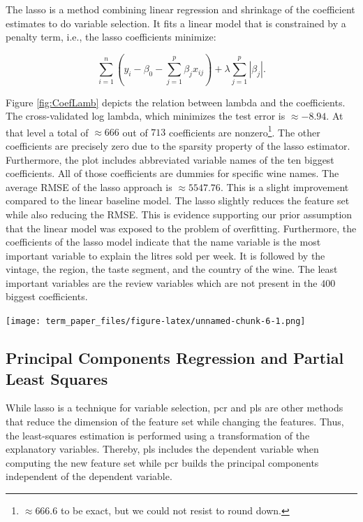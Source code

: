 \documentclass[11pt,]{article}
\let\origfigure\figure
\let\endorigfigure\endfigure
\renewenvironment{figure}[1][2] {
    \expandafter\origfigure\expandafter[H]
} {
    \endorigfigure
}
\let\rmarkdownfootnote\footnote%
\def\footnote{\protect\rmarkdownfootnote}
\begin{document}
The \ac{lasso} is a method combining linear regression and shrinkage of
the coefficient estimates to do variable selection. It fits a linear
model that is constrained by a penalty term, i.e., the \ac{lasso}
coefficients minimize:

\[
\sum_{i=1}^{n}(y_i - \beta_0 - \sum_{j=1}^{p}\beta_jx_{ij})+\lambda\sum_{j=1}^{p}|\beta_j|.
\]

Figure \ref{fig:CoefLamb} depicts the relation between lambda and the
coefficients. The cross-validated log lambda, which minimizes the test
error is \(\approx -8.94\). At that level a total of \(\approx 666\) out
of \(713\) coefficients are
nonzero\footnote{$\approx 666.6$ to be exact, but we could not resist to round down.}.
The other coefficients are precisely zero due to the sparsity property
of the \ac{lasso} estimator. Furthermore, the plot includes abbreviated
variable names of the ten biggest coefficients. All of those
coefficients are dummies for specific wine names. The average \ac{RMSE}
of the \ac{lasso} approach is \(\approx 5547.76\). This is a slight
improvement compared to the linear baseline model. The \ac{lasso}
slightly reduces the feature set while also reducing the \ac{RMSE}. This
is evidence supporting our prior assumption that the linear model was
exposed to the problem of overfitting. Furthermore, the coefficients of
the \ac{lasso} model indicate that the name variable is the most
important variable to explain the litres sold per week. It is followed
by the vintage, the region, the taste segment, and the country of the
wine. The least important variables are the review variables which are
not present in the \(400\) biggest coefficients.

\begin{figure}
\centering
\texttt{[image: term\_paper\_files/figure-latex/unnamed-chunk-6-1.png]}
\caption{\label{fig:CoefLamb}Relation of Coefficients and Shrinkage.}
\end{figure}

\hypertarget{principal-components-regression-and-partial-least-squares}{%
\subsection{Principal Components Regression and Partial Least
Squares}\label{principal-components-regression-and-partial-least-squares}}

While \ac{lasso} is a technique for variable selection, \ac{pcr} and
\ac{pls} are other methods that reduce the dimension of the feature set
while changing the features. Thus, the least-squares estimation is
performed using a transformation of the explanatory variables. Thereby,
\ac{pls} includes the dependent variable when computing the new feature
set while \ac{pcr} builds the principal components independent of the
dependent variable.
\end{document}
